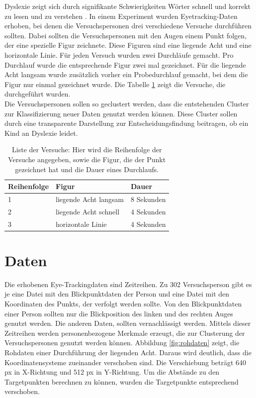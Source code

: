 \documentclass[12pt]{article}
\begin{document}
Dyslexie zeigt sich durch signiﬁkante Schwierigkeiten W\"orter schnell und korrekt zu lesen und zu verstehen \cite{Handlere818, Siegel2006}.
In einem Experiment wurden Eyetracking-Daten erhoben, bei denen die Versuchspersonen drei verschiedene Versuche durchf\"uhren sollten. Dabei sollten die Versuchspersonen mit den Augen einem Punkt folgen, der eine spezielle Figur zeichnete. Diese Figuren sind eine liegende Acht und eine horizontale Linie. F\"ur jeden Versuch wurden zwei Durchl\"aufe gemacht. Pro Durchlauf wurde die entsprechende Figur zwei mal gezeichnet. F\"ur die liegende Acht langsam wurde zus\"atzlich vorher ein Probedurchlauf gemacht, bei dem die Figur nur einmal gezeichnet wurde.
Die Tabelle \ref{tab:Versuche} zeigt die Versuche, die durchgef\"uhrt wurden.\\
Die Versuchspersonen sollen so geclustert werden, dass die entstehenden Cluster zur Klassiﬁzierung neuer Daten genutzt werden k\"onnen. Diese Cluster sollen durch eine transparente Darstellung zur Entscheidungsfindung beitragen, ob ein Kind an Dyslexie leidet.

\begin{table}[h]
	\caption{\label{tab:Versuche}Liste der Versuche: Hier wird die Reihenfolge der Versuche angegeben, sowie die Figur, die der Punkt ge\-zeich\-net hat und die Dauer eines Durchlaufs.}
	\noindent \centering{}
	\bgroup
	\def\arraystretch{2}  %
	\begin{tabular}{|l|l|l|}
		\hline
		\textbf{Reihenfolge} & \textbf{Figur} & \textbf{Dauer}\\
		\hline \hline
		1 & liegende Acht langsam & 8 Sekunden\\
		\hline
		2 & liegende Acht schnell & 4 Sekunden\\
		\hline
		3 & horizontale Linie & 4 Sekunden\\
		\hline
	\end{tabular}
	\egroup
\end{table}

\section*{Daten}
Die erhobenen Eye-Trackingdaten sind Zeitreihen. Zu 302 Versuchsperson gibt es je eine Datei mit den Blickpunktdaten der Person und eine Datei mit den Koordinaten des Punkts, der verfolgt werden sollte. Von den Blickpunktdaten einer Person sollten nur die Blickposition des linken und des rechten Auges genutzt werden. Die anderen Daten, sollten vernachlässigt werden.
Mittels dieser Zeitreihen werden personenbezogene Merkmale erzeugt, die zur Clusterung der Versuchspersonen genutzt werden k\"onnen.
Abbildung \ref{fig:rohdaten} zeigt, die Rohdaten einer Durchf\"uhrung der liegenden Acht. Daraus wird deutlich, dass die Koordinatensysteme zueinander verschoben sind. Die Verschiebung betr\"agt 640 px in X-Richtung und 512 px in Y-Richtung. Um die Abst\"ande zu den Targetpunkten berechnen zu k\"onnen, wurden die Targetpunkte entsprechend verschoben.
\end{document}
